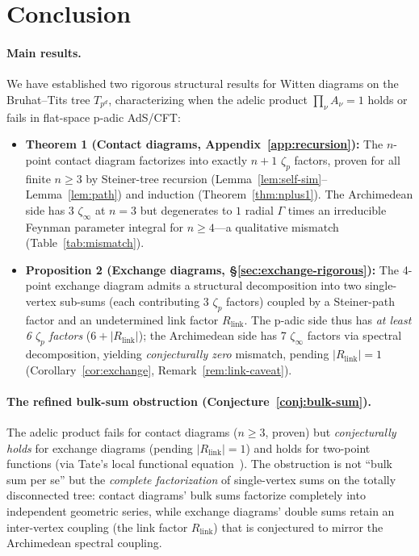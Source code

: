 \documentclass[11pt,a4paper]{article}
\begin{document}
\section{Conclusion}
\label{sec:conclusion}

\paragraph{Main results.}
We have established two rigorous structural results for Witten diagrams on the Bruhat--Tits tree $T_{p^d}$, characterizing when the adelic product $\prod_\nu A_\nu = 1$ holds or fails in flat-space p-adic AdS/CFT:

\begin{itemize}[leftmargin=2em]
    \item \textbf{Theorem 1 (Contact diagrams, Appendix~\ref{app:recursion}):} The $n$-point contact diagram factorizes into exactly $n{+}1$ $\zeta_p$ factors, proven for all finite $n \geq 3$ by Steiner-tree recursion (Lemma~\ref{lem:self-sim}--Lemma~\ref{lem:path}) and induction (Theorem~\ref{thm:nplus1}). The Archimedean side has 3 $\zeta_\infty$ at $n=3$ but degenerates to $1$ radial $\Gamma$ times an irreducible Feynman parameter integral for $n \geq 4$---a qualitative mismatch (Table~\ref{tab:mismatch}).
    \item \textbf{Proposition 2 (Exchange diagrams, \S\ref{sec:exchange-rigorous}):} The 4-point exchange diagram admits a structural decomposition into two single-vertex sub-sums (each contributing 3 $\zeta_p$ factors) coupled by a Steiner-path factor and an undetermined link factor $R_{\mathrm{link}}$. The p-adic side thus has \emph{at least 6 $\zeta_p$ factors} ($6 + |R_{\mathrm{link}}|$); the Archimedean side has 7 $\zeta_\infty$ factors via spectral decomposition, yielding \emph{conjecturally zero} mismatch, pending $|R_{\mathrm{link}}| = 1$ (Corollary~\ref{cor:exchange}, Remark~\ref{rem:link-caveat}).
\end{itemize}

\paragraph{The refined bulk-sum obstruction (Conjecture~\ref{conj:bulk-sum}).}
The adelic product fails for contact diagrams ($n \geq 3$, proven) but \emph{conjecturally holds} for exchange diagrams (pending $|R_{\mathrm{link}}| = 1$) and holds for two-point functions (via Tate's local functional equation~\cite{HSYZ20}). The obstruction is not ``bulk sum per se'' but the \emph{complete factorization} of single-vertex sums on the totally disconnected tree: contact diagrams' bulk sums factorize completely into independent geometric series, while exchange diagrams' double sums retain an inter-vertex coupling (the link factor $R_{\mathrm{link}}$) that is conjectured to mirror the Archimedean spectral coupling.
\end{document}
